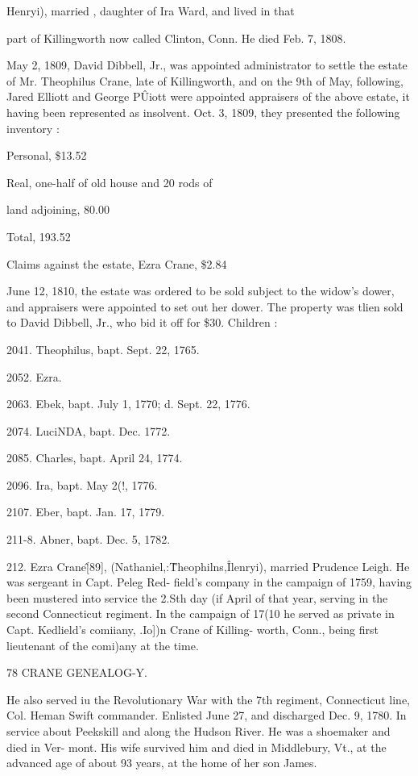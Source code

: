 \documentclass{book}
\begin{document}
Henryi), married , daughter of Ira Ward, and lived in that 

part of Killingworth now called Clinton, Conn. He died Feb. 
7, 1808. 

May 2, 1809, David Dibbell, Jr., was appointed administrator 
to settle the estate of Mr. Theophilus Crane, late of Killingworth, 
and on the 9th of May, following, Jared Elliott and George 
P\^Uiott were appointed appraisers of the above estate, it having 
been represented as insolvent. Oct. 3, 1809, they presented the 
following inventory : 

Personal, \$13.52 

Real, one-half of old house and 20 rods of 

land adjoining, 80.00 

Total, 193.52 

Claims against the estate, Ezra Crane, \$2.84 

June 12, 1810, the estate was ordered to be sold subject to the 
widow's dower, and appraisers were appointed to set out her 
dower. The property was tlien sold to David Dibbell, Jr., who 
bid it off for \$30. Children : 

2041. Theophilus, bapt. Sept. 22, 1765. 

2052. Ezra. 

2063. Ebek, bapt. July 1, 1770; d. Sept. 22, 1776. 

2074. LuciNDA, bapt. Dec. 1772. 

2085. Charles, bapt. April 24, 1774. 

2096. Ira, bapt. May 2(!, 1776. 

2107. Eber, bapt. Jan. 17, 1779. 

211-8. Abner, bapt. Dec. 5, 1782. 

212. Ezra Crane\^ [89], (Nathaniel,:\^ Theophilns,\^ Ilenryi), 
married Prudence Leigh. He was sergeant in Capt. Peleg Red- 
field's company in the campaign of 1759, having been mustered 
into service the 2.Sth day (if April of that year, serving in the 
second Connecticut regiment. In the campaign of 17(10 he served 
as private in Capt. Kedlield's comiiany, .Io])n Crane of Killing- 
worth, Conn., being first lieutenant of the comi)any at the time. 



78 CRANE GENEALOG-Y. 

He also served iu the Revolutionary War with the 7th regiment, 
Connecticut line, Col. Heman Swift commander. Enlisted June 
27, and discharged Dec. 9, 1780. In service about Peekskill and 
along the Hudson River. He was a shoemaker and died in Ver- 
mont. His wife survived him and died in Middlebury, Vt., at 
the advanced age of about 93 years, at the home of her son James. 
\end{document}
